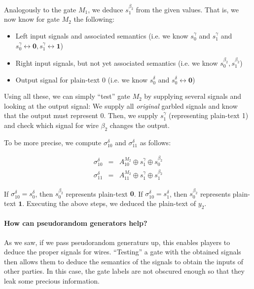Analogously to the gate $M_1$, we deduce $s_1^{\beta_2}$ from the given values. That is, we now know for gate $M_2$ the following:

\begin{itemize}
\item Left input signals and associated semantics (i.e. we know $s_0^\gamma$ and $s_1^\gamma$ and $s_0^\gamma\leftrightarrow\mathbf{0}, s_1^\gamma\leftrightarrow\mathbf{1}$)
\item Right input signals, but not yet associated semantics (i.e. we know $s_0^{\beta_2}, s_1^{\beta_2}$)
\item Output signal for plain-text 0 (i.e. we know $s_0^\delta$ and $s_0^\delta\leftrightarrow \mathbf{0}$)
\end{itemize}

Using all these, we can simply ``test'' gate $M_2$ by supplying several signals and looking at the output signal: We supply all \emph{original} garbled signals and know that the output must represent 0. Then, we supply $s_1^\gamma$ (representing plain-text 1) and check which signal for wire $\beta_2$ changes the output.

To be more precise, we compute $\sigma_{10}^\delta$ and $\sigma_{11}^\delta$ as follows:

\begin{eqnarray*}
  \sigma_{10}^\delta &=& A^{M_2}_{10} \oplus s_1^\gamma \oplus s_0^{\beta_2} \\
  \sigma_{11}^\delta &=& A^{M_2}_{11} \oplus s_1^\gamma \oplus s_1^{\beta_2}
\end{eqnarray*}

If $\sigma_{10}^\delta=s_0^\delta$, then $s_0^{\beta_2}$ represents plain-text $\mathbf{0}$. If $\sigma_{10}^\delta=s_1^\delta$, then $s_0^{\beta_2}$ represents plain-text $\mathbf{1}$. Executing the above steps, we deduced the plain-text of $y_2$.

\paragraph{How can pseudorandom generators help?}

As we saw, if we pass pseudorandom generaturs up, this enables players to deduce the proper signals for wires. ``Testing'' a gate with the obtained signals then allows them to deduce the semantics of the signals to obtain the inputs of other parties. In this case, the gate labels are not obscured enough so that they leak some precious information.

